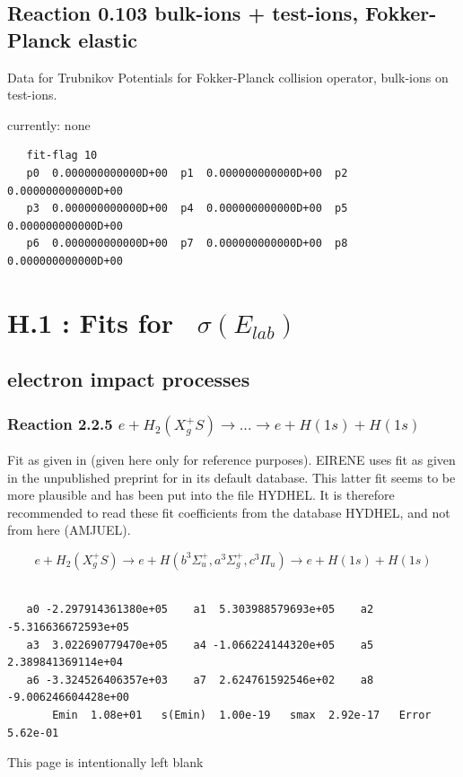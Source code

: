 \documentclass[12pt,dvips]{article}
\begin{document}
\subsection{
Reaction 0.103   bulk-ions + test-ions, Fokker-Planck elastic }
Data for Trubnikov Potentials for Fokker-Planck collision
operator, bulk-ions on test-ions.

currently: none

\begin{small}\begin{verbatim}
   fit-flag 10
   p0  0.000000000000D+00  p1  0.000000000000D+00  p2  0.000000000000D+00
   p3  0.000000000000D+00  p4  0.000000000000D+00  p5  0.000000000000D+00
   p6  0.000000000000D+00  p7  0.000000000000D+00  p8  0.000000000000D+00
\end{verbatim}\end{small}


\newpage

\section{H.1 :  Fits for  \    $\sigma(E_{lab})$}\label{sect1}


\subsection{electron impact processes}
\subsubsection{
Reaction 2.2.5
$ e + H_2 (X_g^+S) \rightarrow . . . \rightarrow e + H(1s) + H(1s) $ }

Fit as given in \cite{kn:Janev} (given here only for reference purposes).
EIRENE uses fit as given in the unpublished preprint for
\cite{kn:Janev} in its default database.
This latter fit seems to be more plausible  and has been put
into the file HYDHEL.
It is therefore recommended to read these
fit coefficients from the database HYDHEL, and not from here (AMJUEL).





\begin{displaymath}
 e + H_2 (X_g^+ S ) \rightarrow e + H (b^3\Sigma^+_u , a^3\Sigma^+_g,
c^3\Pi_u)
             \rightarrow e + H(1s) + H(1s)
\end{displaymath}


\begin{small}\begin{verbatim}

   a0 -2.297914361380e+05    a1  5.303988579693e+05    a2 -5.316636672593e+05
   a3  3.022690779470e+05    a4 -1.066224144320e+05    a5  2.389841369114e+04
   a6 -3.324526406357e+03    a7  2.624761592546e+02    a8 -9.006246604428e+00
       Emin  1.08e+01   s(Emin)  1.00e-19   smax  2.92e-17   Error  5.62e-01
\end{verbatim}\end{small}
\newpage
This page is intentionally left blank
\newpage
\end{document}
